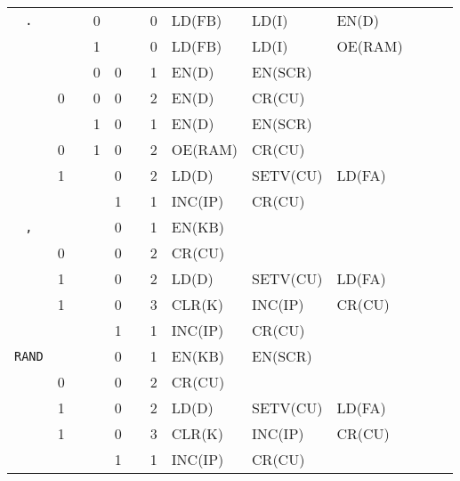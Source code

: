 \begin{footnotesize}
\begin{longtable}[c] {c|ccccc|c|llllll}
    \rowcolor{Gray} \texttt{.}    &   &   & 0 &   &   & 0 & LD(FB)   & LD(I)    & EN(D)   &        &        &                  \\ 
    \rowcolor{White}              &   &   & 1 &   &   & 0 & LD(FB)   & LD(I)    & OE(RAM) &        &        &                 \\ 
    \rowcolor{Gray}               &   &   & 0 & 0 &   & 1 & EN(D)    & EN(SCR)  &         &        &        &                  \\
    \rowcolor{Gray}               & 0 &   & 0 & 0 &   & 2 & EN(D)    & CR(CU)   &         &        &        &                  \\
    \rowcolor{White}              &   &   & 1 & 0 &   & 1 & EN(D)    & EN(SCR)  &         &        &        &                  \\
    \rowcolor{White}              & 0 &   & 1 & 0 &   & 2 & OE(RAM)  & CR(CU)   &         &        &        &                  \\
    \rowcolor{Gray}               & 1 &   &   & 0 &   & 2 & LD(D)    & SETV(CU) & LD(FA)  &        &        &                  \\ 
    \rowcolor{White}               &   &   &   & 1 &   & 1 & INC(IP)  & CR(CU)   &         &        &        &                 \\ \hline
   
    \rowcolor{Gray} \texttt{,}    &   &   &   & 0     &      & 1     & EN(KB)   &          &         &        &        &        \\
    \rowcolor{Gray}               & 0 &   &   & 0     &      & 2     & CR(CU)   &          &         &        &        &        \\
    \rowcolor{White}              & 1 &   &   & 0     &      & 2     & LD(D)   & SETV(CU) & LD(FA)   &        &        &        \\    
    \rowcolor{White}              & 1 &   &   & 0     &      & 3     & CLR(K)  & INC(IP) & CR(CU) &   &     &        \\
    \rowcolor{Gray}              &   &   &   & 1     &      & 1     & INC(IP)  & CR(CU)   &         &        &        &        \\ \hline


    \rowcolor{Gray} \texttt{RAND}  &   &   &   & 0     &      & 1     & EN(KB)   & EN(SCR) &         &        &        &        \\
    \rowcolor{Gray}               & 0 &   &   & 0     &      & 2     & CR(CU)   &          &         &        &        &        \\
    \rowcolor{White}              & 1 &   &   & 0     &      & 2     & LD(D)   & SETV(CU) & LD(FA)   &        &        &        \\    
    \rowcolor{White}              & 1 &   &   & 0     &      & 3     & CLR(K)  & INC(IP) & CR(CU) &   &     &        \\
    \rowcolor{Gray}              &   &   &   & 1     &      & 1     & INC(IP)  & CR(CU)   &         &        &        &        \\ \hline
    


\end{longtable}
\end{footnotesize}
